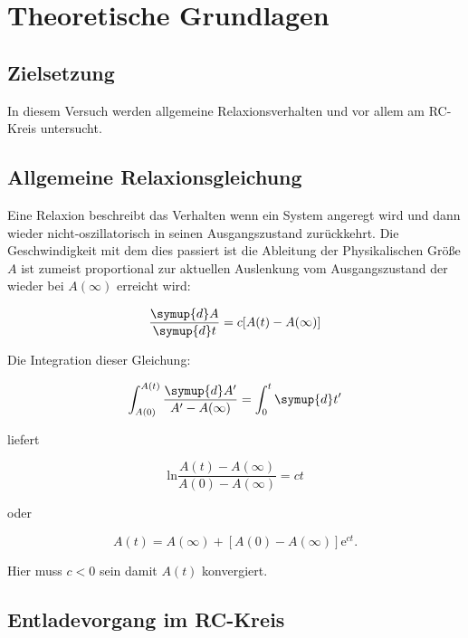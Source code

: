 \section{Theoretische Grundlagen}

    \subsection{Zielsetzung}

        \noindent In diesem Versuch werden allgemeine Relaxionsverhalten und vor allem am RC-Kreis untersucht.

    \subsection{Allgemeine Relaxionsgleichung}

        \noindent Eine Relaxion beschreibt das Verhalten wenn ein System angeregt wird und dann wieder nicht-oszillatorisch in seinen 
        Ausgangszustand zurückkehrt. Die Geschwindigkeit mit dem dies passiert ist die Ableitung der Physikalischen Größe $A$ ist zumeist 
        proportional zur aktuellen Auslenkung vom Ausgangszustand der wieder bei $A(\infty)$ erreicht wird:

        \begin{equation}
            \frac{\symup{d}A}{\symup{d}t}=c[A(t)-A(\infty)]
        \end{equation}

        \noindent Die Integration dieser Gleichung:

        \begin{equation}
            \int_{A(0)}^{A(t)} \frac{\symup{d}A'}{A' - A(\infty)} = \int_0^t \symup{d}t'
        \end{equation}

        \noindent liefert

        \begin{equation}
            \text{ln} \frac{A(t) - A(\infty)}{A(0) - A(\infty)} = ct
        \end{equation}

        \noindent oder

        \begin{equation}
            A(t) = A(\infty) + [A(0) - A(\infty)] \text{e}^{ct} . 
        \end{equation}

        \noindent Hier muss $c < 0$ sein damit $A(t)$ konvergiert.

    \subsection{Entladevorgang im RC-Kreis}

